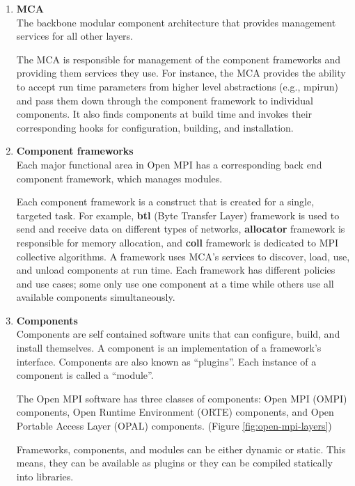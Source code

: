 \begin{enumerate}
\item \textbf {MCA}\\
  The backbone modular component architecture that provides management services for all other layers.
  
  The MCA is responsible for management of the component frameworks and providing them services they use. For instance, the MCA provides the ability to accept run time parameters from higher level abstractions (e.g., mpirun) and pass them down through the component framework to individual components. It also finds components at build time and invokes their corresponding hooks for configuration, building, and installation.
  
\item \textbf{Component frameworks}\\
  Each major functional area in Open MPI has a corresponding back end component framework, which manages modules.
  
  Each component framework is a construct that is created for a single, targeted task. For example, \textbf{btl} (Byte Transfer Layer) framework is used to send and receive data on different types of networks, \textbf{allocator} framework is responsible for memory allocation, and \textbf{coll} framework is dedicated to MPI collective algorithms. A framework uses MCA's services to discover, load, use, and unload components at run time. Each framework has different policies and use cases; some only use one component at a time while others use all available components simultaneously.

\item \textbf {Components}\\
  Components are self contained software units that can configure, build, and install themselves. A component is an implementation of a framework's interface. Components are also known as ``plugins''. Each instance of a component is called a ``module''. 

  The Open MPI software has three classes of components: Open MPI (OMPI) components, Open Runtime Environment (ORTE) components, and Open Portable Access Layer (OPAL) components. (Figure \ref{fig:open-mpi-layers})

  Frameworks, components, and modules can be either dynamic or static. This means, they can be available as plugins or they can be compiled statically into libraries.
\end{enumerate}

